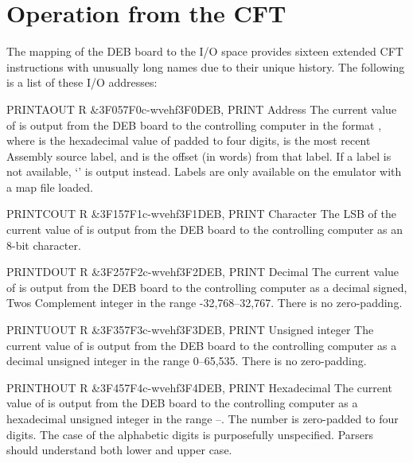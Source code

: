 
\section{Operation from the CFT}

The mapping of the \gls{DEB} board to the I/O space provides sixteen
extended CFT instructions with unusually long names due to their
unique history. The following is a list of these I/O addresses:

\begin{extcmd}{PRINTA}{OUT R \&3F0}{57F0}{c-wvehf}{3F0}{DEB, PRINT Address}             
  The current value of \A{} is output from the
  \gls{DEB} board to the controlling computer in the format
  , where  is the hexadecimal
  value of \A{} padded to four digits,  is the most
  recent \gls{Assembly} source label, and  is the offset (in
  words) from that label. If a label is not available, ‘’ is output instead. Labels are only available on the emulator
  with a map file loaded.%
\end{extcmd}

\begin{extcmd}{PRINTC}{OUT R \&3F1}{57F1}{c-wvehf}{3F1}{DEB, PRINT Character}
  The \gls{LSB} of the current value of \A{} is output from the
  \gls{DEB} board to the controlling computer as an 8-bit
  character.
\end{extcmd}

\begin{extcmd}{PRINTD}{OUT R \&3F2}{57F2}{c-wvehf}{3F2}{DEB, PRINT Decimal}
  The current value of \A{} is output from the \gls{DEB} board to the
  controlling computer as a decimal signed, \gls{Twos Complement}
  integer in the range -32,768–32,767. There is no zero-padding.
\end{extcmd}

\begin{extcmd}{PRINTU}{OUT R \&3F3}{57F3}{c-wvehf}{3F3}{DEB, PRINT Unsigned integer}
  The current value of \A{} is output from the \gls{DEB} board to the
  controlling computer as a decimal unsigned integer in the range
  0–65,535. There is no zero-padding.
\end{extcmd}

\begin{extcmd}{PRINTH}{OUT R \&3F4}{57F4}{c-wvehf}{3F4}{DEB, PRINT Hexadecimal}
  The current value of \A{} is output from the \gls{DEB} board to the
  controlling computer as a hexadecimal unsigned integer in the range
  –. The number is zero-padded to four digits. The
  case of the alphabetic digits is purposefully unspecified. Parsers
  should understand both lower and upper case.
\end{extcmd}

